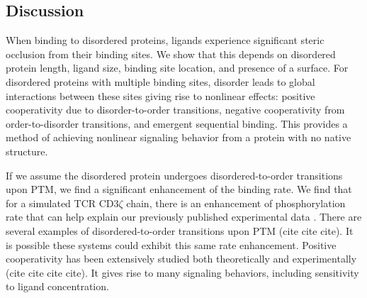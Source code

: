 \documentclass[../../AdvancementSummary.tex]{subfiles}
\begin{document}
\subsection{Discussion}


%




When binding to disordered proteins, ligands experience significant steric occlusion from their binding sites. We show that this depends on disordered protein length, ligand size, binding site location, and presence of a surface.
For disordered proteins with multiple binding sites, disorder leads to global interactions between these sites giving rise to nonlinear effects: positive cooperativity due to disorder-to-order transitions, negative cooperativity from order-to-disorder transitions, and emergent sequential binding. 
This provides a method of achieving nonlinear signaling behavior from a protein with no native structure.	


If we assume the disordered protein undergoes disordered-to-order transitions upon PTM, we find a significant enhancement of the binding rate. 
	We find that for a simulated TCR CD3$\zeta$ chain, there is an enhancement of phosphorylation rate that can help explain our previously published experimental data \cite{Mukhopadhyay2016}.
	There are several examples of disordered-to-order transitions upon PTM (cite cite cite). It is possible these systems could exhibit this same rate enhancement.
	Positive cooperativity has been extensively studied both theoretically and experimentally (cite cite cite cite). It gives rise to many signaling behaviors, including sensitivity to ligand concentration.




%
\end{document}
